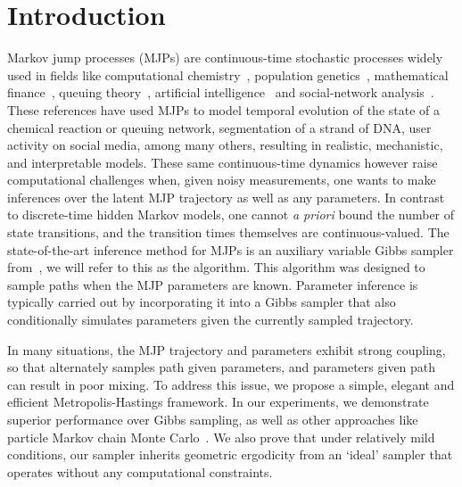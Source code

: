 
\section{Introduction}
\label{sec:intro}
Markov jump processes (MJPs) are continuous-time stochastic processes 
widely used in fields like computational chemistry~\cite{gillespie97}, 
population genetics~\cite{FearnSher2006}, mathematical finance~\cite{Elliott06}, 
queuing theory~\cite{Breuer2003}, artificial intelligence~\cite{XuShe10} and
social-network analysis~\cite{pan2016markov}. %
These references have used MJPs to model temporal evolution of the state 
of a chemical reaction or queuing network, segmentation of a strand of 
DNA, user activity on social media, among many others, resulting in 
realistic, mechanistic, and interpretable models. %
These same continuous-time dynamics however raise computational
challenges when, given noisy measurements, one wants to make inferences 
over the latent MJP trajectory as well as any parameters. 
In contrast to {discrete-time} hidden Markov models, one cannot 
{\em a priori} bound the number of state transitions, and the transition 
times themselves are continuous-valued. 
The state-of-the-art inference method for MJPs is an auxiliary variable 
Gibbs sampler from~\cite{RaoTeh13}, we will refer to this as the {\algname} 
algorithm. This  algorithm was designed to sample paths when the MJP parameters
are known. Parameter inference is typically carried out by 
incorporating it into a Gibbs sampler that also conditionally simulates
parameters given the currently sampled trajectory. 

In many situations, the MJP trajectory and parameters exhibit 
strong coupling, so that alternately samples path given
parameters, and parameters given path can result in poor mixing.  
To address this issue, we propose a simple, elegant and efficient 
Metropolis-Hastings framework. 
In our experiments, we demonstrate superior 
performance over Gibbs sampling, as well as other approaches like 
particle Markov chain Monte Carlo~\cite{Andrieu10}. We also prove 
that under relatively mild conditions, our sampler inherits geometric 
ergodicity from an `ideal' sampler that operates without any computational 
constraints.

